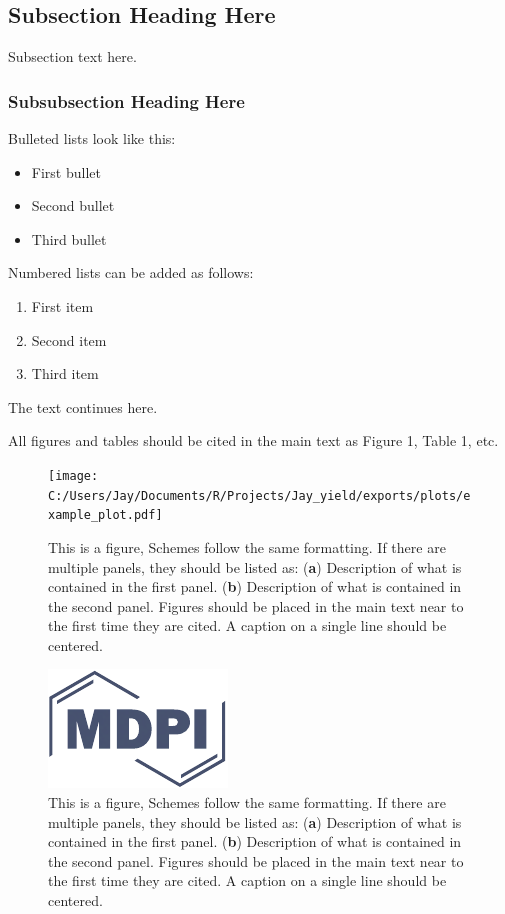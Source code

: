\documentclass[Agronomy,article,submit,moreauthors,pdftex]{mdpi}
\providecommand{\tightlist}{%
  \setlength{\itemsep}{0pt}\setlength{\parskip}{0pt}}
\begin{document}
\hypertarget{subsection-heading-here}{%
\subsection{Subsection Heading Here}\label{subsection-heading-here}}

Subsection text here.

\hypertarget{subsubsection-heading-here}{%
\subsubsection{Subsubsection Heading
Here}\label{subsubsection-heading-here}}

Bulleted lists look like this:

\begin{itemize}
\tightlist
\item
  First bullet
\item
  Second bullet
\item
  Third bullet
\end{itemize}

Numbered lists can be added as follows:

\begin{enumerate}
\def\labelenumi{\arabic{enumi}.}
\tightlist
\item
  First item
\item
  Second item
\item
  Third item
\end{enumerate}

The text continues here.

All figures and tables should be cited in the main text as Figure 1,
Table 1, etc.

\begin{figure}[H]
\centering
\texttt{[image: C:/Users/Jay/Documents/R/Projects/Jay\_yield/exports/plots/example\_plot.pdf]}
\caption{This is a figure, Schemes follow the same formatting. If there are multiple panels, they should be listed as: (\textbf{a}) Description of what is contained in the first panel. (\textbf{b}) Description of what is contained in the second panel. Figures should be placed in the main text near to the first time they are cited. A caption on a single line should be centered.}
\end{figure}

\begin{figure}[H]
\centering
\includegraphics[width=3 cm]{logo-mdpi}
\caption{This is a figure, Schemes follow the same formatting. If there are multiple panels, they should be listed as: (\textbf{a}) Description of what is contained in the first panel. (\textbf{b}) Description of what is contained in the second panel. Figures should be placed in the main text near to the first time they are cited. A caption on a single line should be centered.}
\end{figure}
\end{document}
